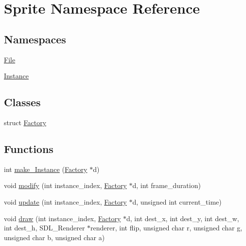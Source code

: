\hypertarget{namespace_sprite}{}\section{Sprite Namespace Reference}
\label{namespace_sprite}
\subsection*{Namespaces}
\begin{DoxyCompactItemize}
\item 
 \mbox{\hyperlink{namespace_sprite_1_1_file}{File}}
\item 
 \mbox{\hyperlink{namespace_sprite_1_1_instance}{Instance}}
\end{DoxyCompactItemize}
\subsection*{Classes}
\begin{DoxyCompactItemize}
\item 
struct \mbox{\hyperlink{struct_sprite_1_1_factory}{Factory}}
\end{DoxyCompactItemize}
\subsection*{Functions}
\begin{DoxyCompactItemize}
\item 
int \mbox{\hyperlink{namespace_sprite_aedfe2be2db35e490d1b2261445e8b626}{make\+\_\+\+Instance}} (\mbox{\hyperlink{struct_sprite_1_1_factory}{Factory}} $\ast$d)
\item 
void \mbox{\hyperlink{namespace_sprite_aa072b202c13fc1b75f6ff8d2f27f809f}{modify}} (int instance\+\_\+index, \mbox{\hyperlink{struct_sprite_1_1_factory}{Factory}} $\ast$d, int frame\+\_\+duration)
\item 
void \mbox{\hyperlink{namespace_sprite_a9e17de977c6af3ca729ad222c11a8547}{update}} (int instance\+\_\+index, \mbox{\hyperlink{struct_sprite_1_1_factory}{Factory}} $\ast$d, unsigned int current\+\_\+time)
\item 
void \mbox{\hyperlink{namespace_sprite_ab6a86b91e42063d1b243d12916769606}{draw}} (int instance\+\_\+index, \mbox{\hyperlink{struct_sprite_1_1_factory}{Factory}} $\ast$d, int dest\+\_\+x, int dest\+\_\+y, int dest\+\_\+w, int dest\+\_\+h, S\+D\+L\+\_\+\+Renderer $\ast$renderer, int flip, unsigned char r, unsigned char g, unsigned char b, unsigned char a)
\end{DoxyCompactItemize}


